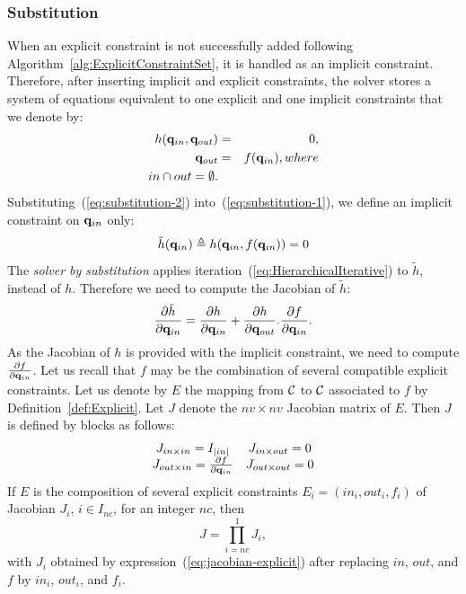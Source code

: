 \subsubsection{Substitution} When an explicit constraint is not successfully added following Algorithm~\ref{alg:ExplicitConstraintSet}, it is handled as an implicit constraint. Therefore, after inserting implicit and explicit constraints, the solver stores a system of equations equivalent to one explicit and one implicit constraints that we denote by:
\begin{eqnarray}\label{eq:substitution-1}
  h(\conf_{in},\conf_{out}) &=& 0, \\
  \label{eq:substitution-2}
  \conf_{out} &=& f(\conf_{in}), \mbox{ where }\\
  \label{eq:substitution-3}
  {in}\cap{out}=\emptyset.
\end{eqnarray}
Substituting~(\ref{eq:substitution-2}) into~(\ref{eq:substitution-1}), we define an implicit constraint on $\mathbf{q}_{in}$ only:
$$
\tilde{h}(\mathbf{q}_{in}) \triangleq h(\mathbf{q}_{in}, f(\mathbf{q}_{in})) = 0
$$
The \textit{solver by substitution} applies iteration~(\ref{eq:HierarchicalIterative}) to $\tilde{h}$, instead of $h$.  Therefore we need to compute the Jacobian of  $\tilde{h}$:
$$
\frac{\partial \tilde{h}}{\partial \mathbf{q}_{in}}  =
\frac{\partial h}{\partial \mathbf{q}_{in}} + \frac{\partial h}{\partial \mathbf{q}_{out}}.
\frac{\partial f}{\partial \mathbf{q}_{in}}.
$$
As the Jacobian of $h$ is provided with the implicit constraint, we need to compute $\frac{\partial f}{\partial \mathbf{q}_{in}}$. Let us recall that $f$ may be the combination of several compatible explicit constraints. Let us denote by $E$ the mapping from $\mathcal{C}$ to $\mathcal{C}$ associated to $f$ by Definition~\ref{def:Explicit}.
Let $J$ denote the $nv\times nv$ Jacobian matrix of $E$. Then $J$ is defined by blocks as follows:
\begin{equation}\label{eq:jacobian-explicit}
\begin{array}{cc}
  J_{{in}\times{in}} = I_{|{in}|} & J_{{in}\times{out}} = 0 \\
  J_{{out}\times{in}} = \frac{\partial f}{\partial \conf_{in}} & J_{{out}\times{out}} = 0
\end{array}
\end{equation}
If $E$ is the composition of several explicit constraints $E_i=(in_i,out_i,f_i)$ of Jacobian $J_i$, $i\in I_{nc}$, for an integer $nc$, then
\begin{equation}\label{eq:jacobian-product}
J = \prod_{i=nc}^{1} J_{i},
\end{equation}
with $J_i$ obtained by expression~(\ref{eq:jacobian-explicit}) after replacing $in$, $out$, and $f$ by $in_i$, $out_i$, and $f_i$.


